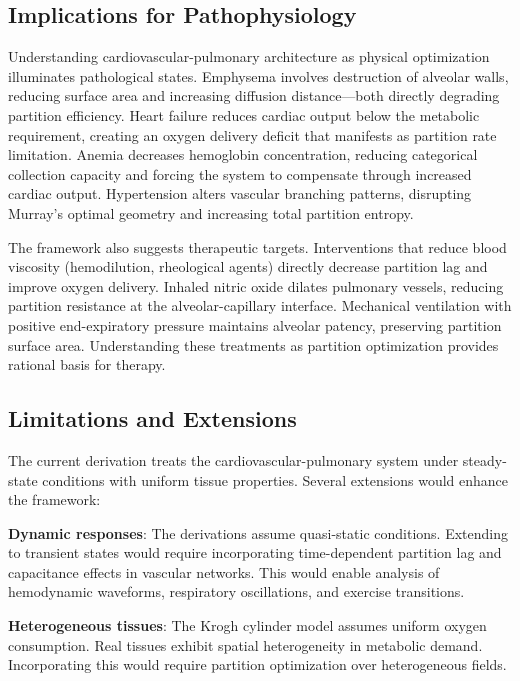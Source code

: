 \documentclass[12pt,a4paper]{article}
\theoremstyle{remark}
\begin{document}
\subsection{Implications for Pathophysiology}

Understanding cardiovascular-pulmonary architecture as physical optimization illuminates pathological states. Emphysema involves destruction of alveolar walls, reducing surface area and increasing diffusion distance—both directly degrading partition efficiency. Heart failure reduces cardiac output below the metabolic requirement, creating an oxygen delivery deficit that manifests as partition rate limitation. Anemia decreases hemoglobin concentration, reducing categorical collection capacity and forcing the system to compensate through increased cardiac output. Hypertension alters vascular branching patterns, disrupting Murray's optimal geometry and increasing total partition entropy.

The framework also suggests therapeutic targets. Interventions that reduce blood viscosity (hemodilution, rheological agents) directly decrease partition lag and improve oxygen delivery. Inhaled nitric oxide dilates pulmonary vessels, reducing partition resistance at the alveolar-capillary interface. Mechanical ventilation with positive end-expiratory pressure maintains alveolar patency, preserving partition surface area. Understanding these treatments as partition optimization provides rational basis for therapy.

\subsection{Limitations and Extensions}

The current derivation treats the cardiovascular-pulmonary system under steady-state conditions with uniform tissue properties. Several extensions would enhance the framework:

\textbf{Dynamic responses}: The derivations assume quasi-static conditions. Extending to transient states would require incorporating time-dependent partition lag and capacitance effects in vascular networks. This would enable analysis of hemodynamic waveforms, respiratory oscillations, and exercise transitions.

\textbf{Heterogeneous tissues}: The Krogh cylinder model assumes uniform oxygen consumption. Real tissues exhibit spatial heterogeneity in metabolic demand. Incorporating this would require partition optimization over heterogeneous fields.
\end{document}
